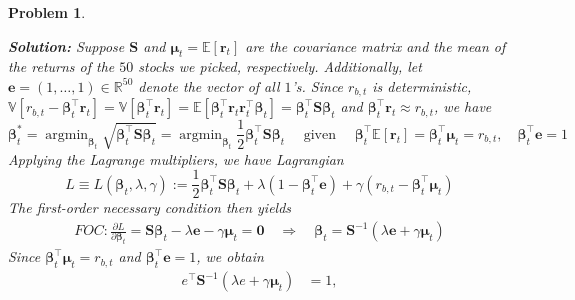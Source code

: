 \documentclass[11pt]{article}
\theoremstyle{plain} %
\newtheorem{problem}[theorem]{Problem}
\newenvironment{solution}
{\color{C2}\normalfont\begin{framed}\begingroup\textbf{Solution:} }
  {\endgroup\end{framed}}
\theoremstyle{remark}
\newcommand{\EE}{\mathbb{E}}
\begin{document}
\begin{problem}
\begin{enumerate}[label=(\alph*)]
\begin{solution}
          Suppose $\boldsymbol{S}$ and $\boldsymbol{\mu}_t =
            \EE\left[\boldsymbol{r}_t\right]$ are the covariance matrix and the
          mean of the returns of the $50$ stocks we picked, respectively.
          Additionally, let $\boldsymbol{e} = (1,\ldots, 1)\in \mathbb{R}^{50}$ denote the vector of all $1$'s. Since
          $r_{b, t}$ is deterministic, $\mathbb{V}\left[r_{b,
                  t}-\boldsymbol{\beta}_t^\top \mathbf{r}_t\right] =
            \mathbb{V}\left[\boldsymbol{\beta}_t^\top \mathbf{r}_t\right] =
            \EE\left[\boldsymbol{\beta}_t^\top \mathbf{r}_t
              \mathbf{r}_t^\top\boldsymbol{\beta}_t\right] =
            \boldsymbol{\beta}_t^\top \boldsymbol{S}\boldsymbol{\beta}_t$
          and $\boldsymbol{\beta}_t^\top\mathbf{r}_t \approx r_{b, t}$, we have
          $$
            \boldsymbol{\beta}_t^*
            =\operatorname{argmin}_{\boldsymbol{\beta}_t} \sqrt{\boldsymbol{\beta}_t^\top \boldsymbol{S}\boldsymbol{\beta}_t}
            =\operatorname{argmin}_{\boldsymbol{\beta}_t} \frac{1}{2}\boldsymbol{\beta}_t^\top \boldsymbol{S}\boldsymbol{\beta}_t
            \quad \text{ given } \quad \boldsymbol{\beta}_t^\top
            \EE\left[\mathbf{r}_t\right] = \boldsymbol{\beta}_t^\top
            \boldsymbol{\mu}_t= r_{b, t}, \quad \boldsymbol{\beta}_t^\top\boldsymbol{e} = 1
          $$
          Applying the Lagrange multipliers, we have Lagrangian
          $$
            L \equiv L(\boldsymbol{\beta}_t, \lambda, \gamma):=\frac{1}{2} \boldsymbol{\beta}_t^{\top} \boldsymbol{S} \boldsymbol{\beta}_t+\lambda\left(1-\boldsymbol{\beta}_t^{\top} \boldsymbol{e}\right)+\gamma\left(r_{b, t}-\boldsymbol{\beta}_t^{\top} \boldsymbol{\mu}_t\right)
          $$
          The first-order necessary condition then yields
          \begin{align}
            F O C : \frac{\partial L}{\partial \boldsymbol{\beta}_t}=\boldsymbol{S} \boldsymbol{\beta}_t-\lambda \boldsymbol{e}-\gamma \boldsymbol{\mu}_t=\mathbf{0}
            \quad \Longrightarrow \quad \boldsymbol{\beta}_t=\boldsymbol{S}^{-1}(\lambda \boldsymbol{e}+\gamma \boldsymbol{\mu}_t)
            \label{eq: optimal portfolio weights}
          \end{align}
          Since $\boldsymbol{\beta}_t^{\top} \boldsymbol{\mu}_t=r_{b, t}$ and $\boldsymbol{\beta}_t^{\top} \boldsymbol{e}=1$, we obtain
          $$
            \begin{aligned}
              e^{\top} \boldsymbol{S}^{-1}(\lambda e+\gamma \boldsymbol{\mu}_t)                  & =1,       \\

\end{aligned}$$
\end{solution}
\end{enumerate}
\end{problem}
\end{document}
